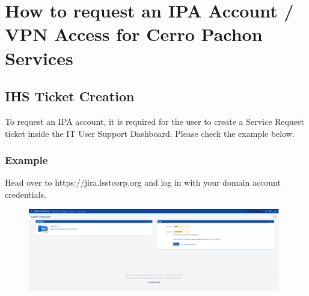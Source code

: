 \newpage

\section{How to request an IPA Account / VPN Access for Cerro Pachon Services}

\subsection{IHS Ticket Creation}
  
  To request an IPA account, it is required for the user to create a Service Request ticket inside the IT User Support Dashboard.
  Please check the example below.

\subsubsection{Example}

  Head over to https://jira.lsstcorp.org and log in with your domain account credentials.

\begin{figure}
  \includegraphics[width=11cm]{Images/example1.png}
  \centering
\end{figure}